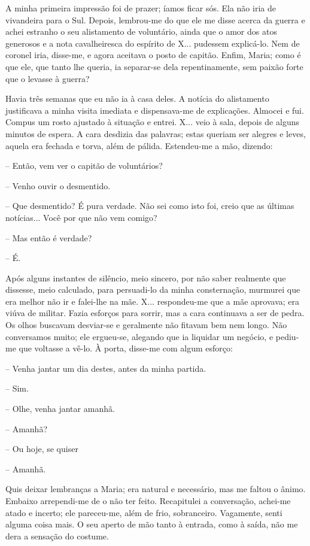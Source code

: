 A minha primeira impressão foi de prazer; íamos ficar sós. Ela não iria
de vivandeira para o Sul. Depois, lembrou-me do que ele me disse acerca
da guerra e achei estranho o seu alistamento de voluntário, ainda que o
amor dos atos generosos e a nota cavalheiresca do espírito de X...
pudessem explicá-lo. Nem de coronel iria, disse-me, e agora aceitava o
posto de capitão. Enfim, Maria; como é que ele, que tanto lhe queria, ia
separar-se dela repentinamente, sem paixão forte que o levasse à guerra?

Havia três semanas que eu não ia à casa deles. A notícia do alistamento
justificava a minha visita imediata e dispensava-me de explicações.
Almocei e fui. Compus um rosto ajustado à situação e entrei. X... veio à
sala, depois de alguns minutos de espera. A cara desdizia das palavras;
estas queriam ser alegres e leves, aquela era fechada e torva, além de
pálida. Estendeu-me a mão, dizendo:

-- Então, vem ver o capitão de voluntários?

-- Venho ouvir o desmentido.

-- Que desmentido? É pura verdade. Não sei como isto foi, creio que as
últimas notícias... Você por que não vem comigo?

-- Mas então é verdade?

-- É.

Após alguns instantes de silêncio, meio sincero, por não saber realmente
que dissesse, meio calculado, para persuadi-lo da minha consternação,
murmurei que era melhor não ir e falei-lhe na mãe. X... respondeu-me que
a mãe aprovava; era viúva de militar. Fazia esforços para sorrir, mas a
cara continuava a ser de pedra. Os olhos buscavam desviar-se e
geralmente não fitavam bem nem longo. Não conversamos muito; ele
ergueu-se, alegando que ia liquidar um negócio, e pediu-me que voltasse
a vê-lo. À porta, disse-me com algum esforço:

-- Venha jantar um dia destes, antes da minha partida.

-- Sim.

-- Olhe, venha jantar amanhã.

-- Amanhã?

-- Ou hoje, se quiser

-- Amanhã.

Quis deixar lembranças a Maria; era natural e necessário, mas me faltou
o ânimo. Embaixo arrependi-me de o não ter feito. Recapitulei a
conversação, achei-me atado e incerto; ele pareceu-me, além de frio,
sobranceiro. Vagamente, senti alguma coisa mais. O seu aperto de mão
tanto à entrada, como à saída, não me dera a sensação do costume.


